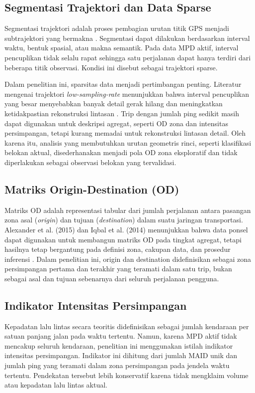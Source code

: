 \subsection{Segmentasi Trajektori dan Data Sparse}

Segmentasi trajektori adalah proses pembagian urutan titik GPS menjadi subtrajektori yang bermakna \cite{zheng2015}. Segmentasi dapat dilakukan berdasarkan interval waktu, bentuk spasial, atau makna semantik. Pada data MPD aktif, interval pencuplikan tidak selalu rapat sehingga satu perjalanan dapat hanya terdiri dari beberapa titik observasi. Kondisi ini disebut sebagai trajektori sparse.

Dalam penelitian ini, sparsitas data menjadi pertimbangan penting. Literatur mengenai trajektori \textit{low-sampling-rate} menunjukkan bahwa interval pencuplikan yang besar menyebabkan banyak detail gerak hilang dan meningkatkan ketidakpastian rekonstruksi lintasan \cite{zheng2012,bian2020}. Trip dengan jumlah ping sedikit masih dapat digunakan untuk deskripsi agregat, seperti OD zona dan intensitas persimpangan, tetapi kurang memadai untuk rekonstruksi lintasan detail. Oleh karena itu, analisis yang membutuhkan urutan geometris rinci, seperti klasifikasi belokan aktual, disederhanakan menjadi pola OD zona eksploratif dan tidak diperlakukan sebagai observasi belokan yang tervalidasi.

\subsection{Matriks Origin-Destination (OD)}

Matriks OD adalah representasi tabular dari jumlah perjalanan antara pasangan zona asal (\textit{origin}) dan tujuan (\textit{destination}) dalam suatu jaringan transportasi. Alexander et al. (2015) dan Iqbal et al. (2014) menunjukkan bahwa data ponsel dapat digunakan untuk membangun matriks OD pada tingkat agregat, tetapi hasilnya tetap bergantung pada definisi zona, cakupan data, dan prosedur inferensi \cite{alexander2015,iqbal2014}. Dalam penelitian ini, origin dan destination didefinisikan sebagai zona persimpangan pertama dan terakhir yang teramati dalam satu trip, bukan sebagai asal dan tujuan sebenarnya dari seluruh perjalanan pengguna.

\subsection{Indikator Intensitas Persimpangan}

Kepadatan lalu lintas secara teoritis didefinisikan sebagai jumlah kendaraan per satuan panjang jalan pada waktu tertentu. Namun, karena MPD aktif tidak mencakup seluruh kendaraan, penelitian ini menggunakan istilah indikator intensitas persimpangan. Indikator ini dihitung dari jumlah MAID unik dan jumlah ping yang teramati dalam zona persimpangan pada jendela waktu tertentu. Pendekatan tersebut lebih konservatif karena tidak mengklaim volume atau kepadatan lalu lintas aktual.
